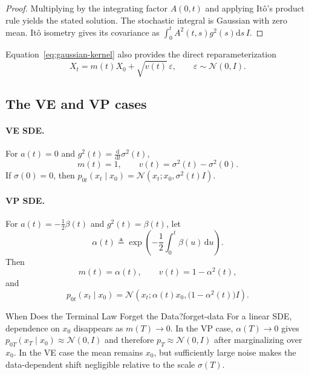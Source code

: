 \documentclass[11pt,a4paper]{article}
\renewcommand{\d}{\mathrm{d}}
\newcommand{\cN}{\mathcal{N}}
\begin{document}
\begin{proof}
Multiplying by the integrating factor $A(0,t)$ and applying It\^o's product
rule yields the stated solution.  The stochastic integral is Gaussian with
zero mean.  It\^o isometry gives its covariance as
$\int_0^t A^2(t,s)g^2(s)\d s\,I$.
\end{proof}

Equation~\eqref{eq:gaussian-kernel} also provides the direct reparameterization
\begin{equation}\label{eq:reparam}
  X_t=m(t)X_0+\sqrt{v(t)}\,\varepsilon,
  \qquad \varepsilon\sim\cN(0,I).
\end{equation}

\subsection{The VE and VP cases}

\paragraph{VE SDE.}
For $a(t)=0$ and $g^2(t)=\frac{\d}{\d t}\sigma^2(t)$,
\[
  m(t)=1,
  \qquad
  v(t)=\sigma^2(t)-\sigma^2(0).
\]
If $\sigma(0)=0$, then
$p_{0t}(x_t\mid x_0)=\cN(x_t;x_0,\sigma^2(t)I)$.

\paragraph{VP SDE.}
For $a(t)=-\frac12\beta(t)$ and $g^2(t)=\beta(t)$, let
\[
  \alpha(t)\triangleq
  \exp\!\left(-\frac12\int_0^t\beta(u)\,\d u\right).
\]
Then
\[
  m(t)=\alpha(t),
  \qquad
  v(t)=1-\alpha^2(t),
\]
and
\begin{equation}\label{eq:vp-kernel}
  p_{0t}(x_t\mid x_0)
  =\cN\!\left(x_t;\alpha(t)x_0,
                     \bigl(1-\alpha^2(t)\bigr)I\right).
\end{equation}

\begin{remark}{When Does the Terminal Law Forget the Data?}{forget-data}
For a linear SDE, dependence on $x_0$ disappears as $m(T)\to0$.  In the VP
case, $\alpha(T)\to0$ gives $p_{0T}(x_T\mid x_0)\approx\cN(0,I)$ and therefore
$p_T\approx\cN(0,I)$ after marginalizing over $x_0$.  In the VE case the mean
remains $x_0$, but sufficiently large noise makes the data-dependent shift
negligible relative to the scale $\sigma(T)$.
\end{remark}

\end{document}
